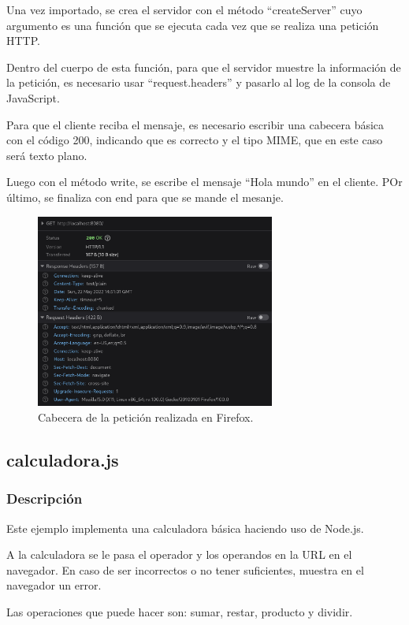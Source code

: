 \documentclass{article}
\begin{document}
Una vez importado, se crea el servidor con el método ``createServer'' cuyo argumento es una función que se ejecuta cada vez que se realiza una petición HTTP.

Dentro del cuerpo de esta función, para que el servidor muestre la información de la petición, es necesario usar ``request.headers'' y pasarlo al log de la consola de JavaScript.

Para que el cliente reciba el mensaje, es necesario escribir una cabecera básica con el código 200, indicando que es correcto y el tipo MIME, que en este caso será texto plano.

Luego con el método write, se escribe el mensaje ``Hola mundo'' en el cliente. POr último, se finaliza con end para que se mande el mesanje. %

\begin{figure}[H]
    \centering
    \includegraphics[width=0.7\textwidth]{images/header.png}
    \caption{Cabecera de la petición realizada en Firefox.}
\end{figure}

\subsection{calculadora.js}
\subsubsection{Descripción}
Este ejemplo implementa una calculadora básica haciendo uso de Node.js. 

A la calculadora se le pasa el operador y los operandos en la URL en el navegador. En caso de ser incorrectos o no tener suficientes, muestra en el navegador un error.

Las operaciones que puede hacer son: sumar, restar, producto y dividir.
\end{document}
